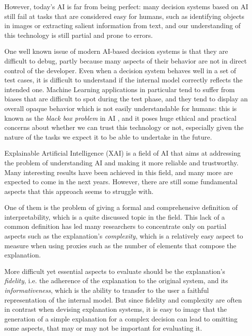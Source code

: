 \documentclass[conference]{IEEEtran}
\newcommand{\cit}[1][]{\todo[tickmarkheight=0.2cm]{cit #1}}
\begin{document}
However, today's AI is far from being perfect: many decision systems based on AI
still fail at tasks that are considered easy for humans, such as identifying
objects in images or extracting salient information from text, and our
understanding of this technology is still partial and prone to
errors.

One well known issue of modern AI-based decision systems is that they are
difficult to debug, partly because many aspects of their behavior are not in
direct control of the developer. Even when a decision system behaves well in a
set of test cases, it is difficult to understand if the internal model correctly
reflects the intended one. Machine Learning applications in particular tend to
suffer from biases \cit that are difficult to spot during the test phase, and they
tend to display an overall opaque behavior which is not easily understandable
for humans: this is known as the \textit{black box problem} in AI \cit, and it
poses huge ethical and practical concerns about whether we can trust this
technology or not, especially given the nature of the tasks we expect it to be
able to undertake in the future.

Explainable Artificial Intelligence (XAI) is a field of AI that aims at
addressing the problem of understanding AI and making it more reliable and
trustworthy. Many interesting results have been achieved in this field, and many
more are expected to come in the next years. However, there are still some
fundamental aspects that this approach seems to struggle with.

One of them is
the problem of giving a formal and comprehensive definition of interpretability, which is a quite
discussed topic in the field. \cit This lack of a common definition has led
many researchers to concentrate only on partial aspects such as the
explanation's \textit{complexity}, which is a relatively easy aspect to measure
when using proxies such as the number of elements that compose the explanation.

More difficult yet essential aspects to evaluate should be the explanation's
\textit{fidelity}, i.e. the adherence of the explanation to the original system, and its \textit{informativeness}, which is the ability to transfer to the user a faithful representation of the internal model.
But since fidelity and complexity are often in contrast when devising explanation systems, it is easy to image that the generation of a simple explanation for a complex decision can lead to omitting some aspects, that may or may not be important for evaluating it.
\end{document}
